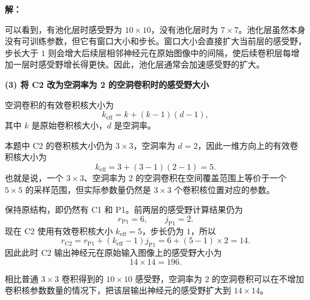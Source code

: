 \documentclass[a4paper]{article}
\newenvironment{solution}{\par\noindent\textbf{解：}\par}{\par}
\begin{document}
\begin{enumerate}
\begin{solution}
可以看到，有池化层时感受野为 $10\times 10$，没有池化层时为 $7\times 7$。池化层虽然本身没有可训练参数，但它有窗口大小和步长。窗口大小会直接扩大当前层的感受野，步长大于 $1$ 则会增大后续层相邻神经元在原始图像中的间隔，使后续卷积层每增加一层时感受野增长得更快。因此，池化层通常会加速感受野的扩大。

\textbf{(3) 将 C2 改为空洞率为 2 的空洞卷积时的感受野大小}

空洞卷积的有效卷积核大小为
\[
k_{\mathrm{eff}}
=
k+(k-1)(d-1),
\]
其中 $k$ 是原始卷积核大小，$d$ 是空洞率。

本题中 C2 的卷积核大小仍为 $3\times 3$，空洞率为 $d=2$，因此一维方向上的有效卷积核大小为
\[
k_{\mathrm{eff}}
=
3+(3-1)(2-1)
=
5.
\]
也就是说，一个 $3\times 3$、空洞率为 $2$ 的空洞卷积在空间覆盖范围上等价于一个 $5\times 5$ 的采样范围，但实际参数量仍然是 $3\times 3$ 个卷积核位置对应的参数。

保持原结构，即仍然有 C1 和 P1。前两层的感受野计算结果仍为
\[
r_{\mathrm{P1}}=6,\qquad j_{\mathrm{P1}}=2.
\]
现在 C2 使用有效卷积核大小 $k_{\mathrm{eff}}=5$，步长仍为 $1$，所以
\[
r_{\mathrm{C2}}
=
r_{\mathrm{P1}}+(k_{\mathrm{eff}}-1)j_{\mathrm{P1}}
=
6+(5-1)\times 2
=
14.
\]
因此此时 C2 输出神经元在原始输入图像上的感受野大小为
\[
14\times 14=196.
\]

相比普通 $3\times 3$ 卷积得到的 $10\times 10$ 感受野，空洞率为 $2$ 的空洞卷积可以在不增加卷积核参数数量的情况下，把该层输出神经元的感受野扩大到 $14\times 14$。
\end{solution}

\end{enumerate}
\end{document}
